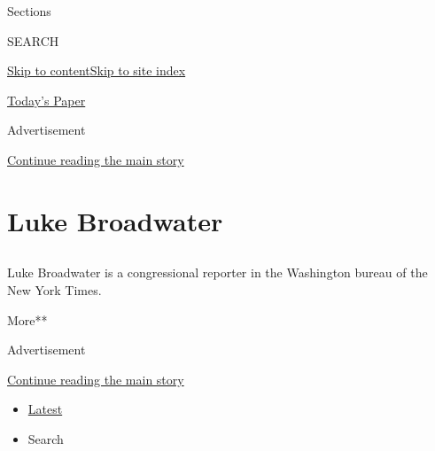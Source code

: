 Sections

SEARCH

\protect\hyperlink{site-content}{Skip to
content}\protect\hyperlink{site-index}{Skip to site index}

\href{https://myaccount.nytimes3xbfgragh.onion/auth/login?response_type=cookie\&client_id=vi}{}

\href{https://www.nytimes3xbfgragh.onion/section/todayspaper}{Today's
Paper}

Advertisement

\protect\hyperlink{after-top}{Continue reading the main story}

\hypertarget{luke-broadwater}{%
\section{Luke Broadwater}\label{luke-broadwater}}

\subsection{}

Luke Broadwater is a congressional reporter in the Washington bureau of
the New York Times.

More**

Advertisement

\protect\hyperlink{after-mid1}{Continue reading the main story}

\begin{itemize}
\tightlist
\item
  \protect\hyperlink{stream-panel}{Latest}
\item
  Search
\end{itemize}

